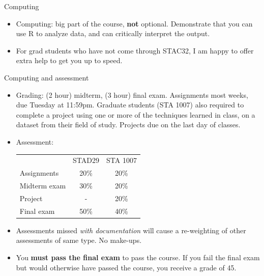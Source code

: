 \documentclass[unknownkeysallowed]{beamer}\usepackage[]{graphicx}\usepackage[]{color}
\begin{document}
\begin{frame}[fragile]{Computing}

  \begin{itemize}
  \item Computing: big part of the course, {\bf not}
    optional. Demonstrate that you can use 
    R to analyze data, and can
    critically interpret the output.
  \item For grad students who have not come through STAC32, I am happy
    to offer extra help to get you up to speed.
  \end{itemize}
  
\end{frame}


\begin{frame}{Computing and assessment}
\begin{itemize}
\item Grading: (2 hour) midterm, (3 hour) final exam. Assignments most
  weeks, due Tuesday at 11:59pm. 
  Graduate students (STA 1007) also required to
  complete a project using one or more of the techniques learned in
  class, on a dataset from their field of study.    Projects due on
  the last day of classes.

\item Assessment:

  \begin{tabular}{lcc}
    & STAD29 & STA 1007\\
    Assignments & 20\% & 20\%\\
    Midterm exam & 30\%  & 20\% \\
    Project & - & 20\%\\
    Final exam & 50\% & 40\%
  \end{tabular}

\item Assessments missed \emph{with documentation} will cause a
  re-weighting of other assessments of same type. No make-ups.
\item You \textbf{must pass the final exam} to pass the course. If you
  fail the final exam but would otherwise have passed the course, you
  receive a grade of 45.

\end{itemize}
\end{frame}
\end{document}
